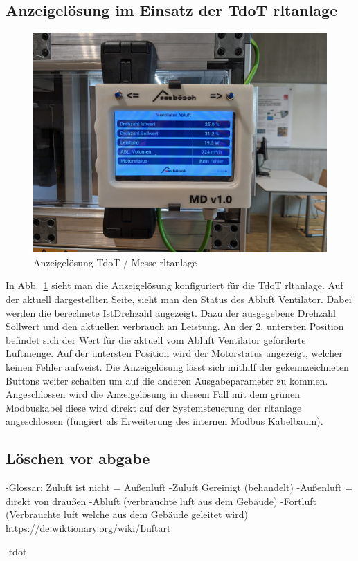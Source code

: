\subsection{Anzeigelösung im Einsatz der TdoT \ac{rltanlage}}
\begin{figure}[H]
	\centering
	\includegraphics[width=0.7\linewidth]{Bilder/tdot_anzeige}
	\caption{Anzeigelösung TdoT / Messe \ac{rltanlage}} 
	\label{fig:tdot_anzeige}
\end{figure}

In Abb.~\ref{fig:tdot_anzeige} sieht man die Anzeigelösung konfiguriert für die TdoT \ac{rltanlage}. Auf der aktuell dargestellten Seite, sieht man den Status des Abluft Ventilator. Dabei werden die berechnete IstDrehzahl angezeigt. Dazu der ausgegebene Drehzahl Sollwert und den aktuellen verbrauch an Leistung. An der 2. untersten Position befindet sich der Wert für die aktuell vom Abluft Ventilator geförderte Luftmenge. Auf der untersten Position wird der Motorstatus angezeigt, welcher keinen Fehler aufweist. Die Anzeigelösung lässt sich mithilf der gekennzeichneten Buttons weiter schalten um auf die anderen Ausgabeparameter zu kommen. Angeschlossen wird die Anzeigelösung in diesem Fall mit dem grünen Modbuskabel diese wird direkt auf der Systemsteuerung der \ac{rltanlage} angeschlossen (fungiert als Erweiterung des internen Modbus Kabelbaum).



\subsection{Löschen vor abgabe}

-Glossar: Zuluft ist nicht = Außenluft 
-Zuluft Gereinigt (behandelt) 
-Außenluft = direkt von draußen
-Abluft (verbrauchte luft aus dem Gebäude)
-Fortluft (Verbrauchte luft welche aus dem Gebäude geleitet wird) https://de.wiktionary.org/wiki/Luftart

-tdot

